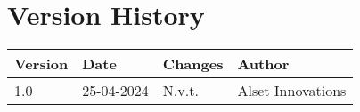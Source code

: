 \section*{Version History} 

\begin{table}[h]
\begin{tabular}{|l|l|l|l|}
\hline
\rowcolor[HTML]{4472C4} 
{\color[HTML]{FFFFFF} \textbf{Version}} &
  {\color[HTML]{FFFFFF} \textbf{Date}} &
  {\color[HTML]{FFFFFF} \textbf{Changes}} &
  {\color[HTML]{FFFFFF} \textbf{Author}} \\ \hline
\rowcolor[HTML]{D9E1F2} 
1.0 &
  \multicolumn{1}{c|}{\cellcolor[HTML]{D9E1F2}25-04-2024} &
 N.v.t. &
  Alset Innovations \\ \hline



\end{tabular}
\end{table}

{}
\listoffigures

\newpage
\tableofcontents